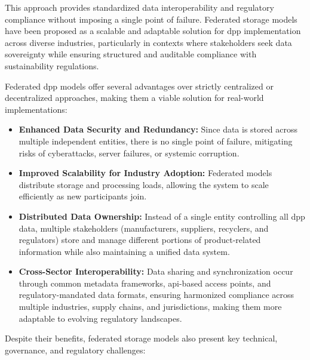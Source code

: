 This approach provides standardized data interoperability and regulatory compliance without imposing a single point of failure. Federated storage models have been proposed as a scalable and adaptable solution for \ac{dpp} implementation across diverse industries, particularly in contexts where stakeholders seek data sovereignty while ensuring structured and auditable compliance with sustainability regulations. \autocite{Ducuing.2023}

Federated \ac{dpp} models offer several advantages over strictly centralized or decentralized approaches, making them a viable solution for real-world implementations:

\begin{itemize}[itemsep=0.5\baselineskip]
    \item \textbf{Enhanced Data Security and Redundancy:} Since data is stored across multiple independent entities, there is no single point of failure, mitigating risks of cyberattacks, server failures, or systemic corruption. \autocite{Koppelaar.2023}
    \item \textbf{Improved Scalability for Industry Adoption:} Federated models distribute storage and processing loads, allowing the system to scale efficiently as new participants join. \autocite{Redeker.2024}
    \item \textbf{Distributed Data Ownership:} Instead of a single entity controlling all \ac{dpp} data, multiple stakeholders (manufacturers, suppliers, recyclers, and regulators) store and manage different portions of product-related information while also maintaining a unified data system. \autocite{Koppelaar.2023}
    \item \textbf{Cross-Sector Interoperability:} Data sharing and synchronization occur through common metadata frameworks, \ac{api}-based access points, and regulatory-mandated data formats, ensuring harmonized compliance across multiple industries, supply chains, and jurisdictions, making them more adaptable to evolving regulatory landscapes. \autocite{Plociennik.2022, Jansen.2023}
\end{itemize}

Despite their benefits, federated storage models also present key technical, governance, and regulatory challenges:


